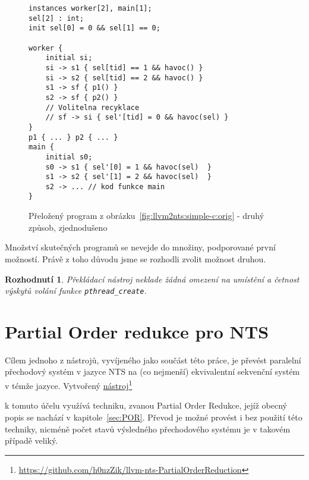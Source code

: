 \documentclass[12pt]{fithesis2}
\newtheorem{decision}  {Rozhodnutí}
\newcommand\fnurl[2]{%
  \href{#2}{#1}\footnote{\url{#2}}%
}
\begin{document}
\begin{figure}[t]
\begin{lstlisting}
instances worker[2], main[1];
sel[2] : int;
init sel[0] = 0 && sel[1] == 0;

worker {
	initial si;
	si -> s1 { sel[tid] == 1 && havoc() }
	si -> s2 { sel[tid] == 2 && havoc() }
	s1 -> sf { p1() }
	s2 -> sf { p2() }
	// Volitelna recyklace
	// sf -> si { sel'[tid] = 0 && havoc(sel) }
}
p1 { ... } p2 { ... }
main {
	initial s0;
	s0 -> s1 { sel'[0] = 1 && havoc(sel)  }
	s1 -> s2 { sel'[1] = 2 && havoc(sel)  }
	s2 -> ... // kod funkce main
}
\end{lstlisting}
\caption{Přeložený program z obrázku~\ref{fig:llvm2nts:simple-c:orig} - druhý způsob, zjednodušeno}
\label{fig:llvm2nts:simple-c:realworld-nts}
\end{figure}

Množství skutečných programů se nevejde do množiny, podporované první možností. Právě z toho důvodu jsme se rozhodli zvolit možnost druhou.

\begin{decision}\label{decision:real-world-programs}
Překládací nástroj neklade žádná omezení na umístění a četnost výskytů volání funkce \texttt{pthread\_create}.
\end{decision}





\chapter{Partial Order redukce pro NTS}
\label{sec:nts-por}
Cílem jednoho z nástrojů, vyvíjeného jako součást této práce, je převést paralelní přechodový systém v jazyce NTS na (co nejmenší) ekvivalentní sekvenční systém v témže jazyce. Vytvořený
\fnurl{nástroj}{https://github.com/h0nzZik/llvm-nts-PartialOrderReduction}
k tomuto účelu využívá techniku, zvanou Partial Order Redukce, jejíž obecný popis se nachází v kapitole~\ref{sec:POR}. Převod je možné provést i bez použití této techniky, nicméně počet stavů výsledného přechodového systému je v takovém případě veliký.
\end{document}
